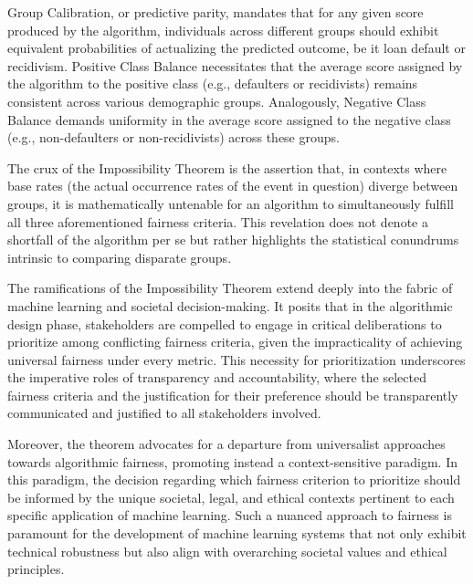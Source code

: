 Group Calibration, or predictive parity, mandates that for any given score produced by the algorithm, individuals across different groups should exhibit equivalent probabilities of actualizing the predicted outcome, be it loan default or recidivism. Positive Class Balance necessitates that the average score assigned by the algorithm to the positive class (e.g., defaulters or recidivists) remains consistent across various demographic groups. Analogously, Negative Class Balance demands uniformity in the average score assigned to the negative class (e.g., non-defaulters or non-recidivists) across these groups.

The crux of the Impossibility Theorem is the assertion that, in contexts where base rates (the actual occurrence rates of the event in question) diverge between groups, it is mathematically untenable for an algorithm to simultaneously fulfill all three aforementioned fairness criteria. This revelation does not denote a shortfall of the algorithm per se but rather highlights the statistical conundrums intrinsic to comparing disparate groups.

The ramifications of the Impossibility Theorem extend deeply into the fabric of machine learning and societal decision-making. It posits that in the algorithmic design phase, stakeholders are compelled to engage in critical deliberations to prioritize among conflicting fairness criteria, given the impracticality of achieving universal fairness under every metric. This necessity for prioritization underscores the imperative roles of transparency and accountability, where the selected fairness criteria and the justification for their preference should be transparently communicated and justified to all stakeholders involved.

Moreover, the theorem advocates for a departure from universalist approaches towards algorithmic fairness, promoting instead a context-sensitive paradigm. In this paradigm, the decision regarding which fairness criterion to prioritize should be informed by the unique societal, legal, and ethical contexts pertinent to each specific application of machine learning. Such a nuanced approach to fairness is paramount for the development of machine learning systems that not only exhibit technical robustness but also align with overarching societal values and ethical principles.


